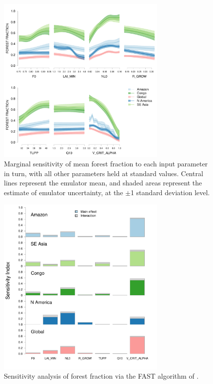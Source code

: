 \documentclass[esd, article]{copernicus} %
\providecommand{\DIFaddbeginFL}{} %
\providecommand{\DIFaddendFL}{} %
\providecommand{\DIFdelbeginFL}{} %
\providecommand{\DIFdelendFL}{} %
\begin{document}
\begin{figure}[t]
\DIFdelbeginFL %
\DIFdelendFL \DIFaddbeginFL \includegraphics[width=8.3cm]{graphics/amaz_oat_sens.pdf}
\DIFaddendFL \caption{Marginal sensitivity of mean forest fraction to each input parameter in turn, with all other parameters held at standard values. Central lines represent the emulator mean, and shaded areas represent the estimate of emulator uncertainty, at the $\pm$1 standard deviation level.}
\label{fig:amaz_oat_sens}
\end{figure}

\begin{figure}[t]
\DIFdelbeginFL %
\DIFdelendFL \DIFaddbeginFL \includegraphics[width=8.3cm]{graphics/FAST_histograms.pdf}
\DIFaddendFL \caption{Sensitivity analysis of forest fraction via the FAST algorithm of \cite{saltelli1999sensitivity}.}
\label{fig:FAST_histograms}
\end{figure}
\end{document}
